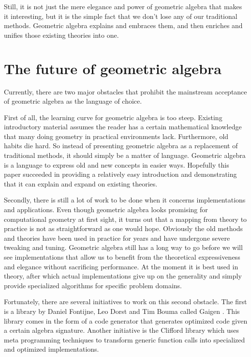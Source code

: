 \documentclass[10pt]{report}
\begin{document}
Still, it is not just the mere elegance and power of geometric
algebra that makes it interesting, but it is the simple fact that
we don't lose any of our traditional methods. Geometric algebra
explains and embraces them, and then enriches and unifies those
existing theories into one.

\section{The future of geometric algebra}

Currently, there are two major obstacles that prohibit the
mainstream acceptance of geometric algebra as the language of
choice.

First of all, the learning curve for geometric algebra is too
steep. Existing introductory material assumes the reader has a
certain mathematical knowledge that many doing geometry in
practical environments lack. Furthermore, old habits die hard. So
instead of presenting geometric algebra as a replacement of
traditional methods, it should simply be a matter of language.
Geometric algebra is a language to express old and new concepts in
easier ways. Hopefully this paper succeeded in providing a
relatively easy introduction and demonstrating that it can explain
and expand on existing theories.

Secondly, there is still a lot of work to be done when it concerns
implementations and applications. Even though geometric algebra
looks promising for computational geometry at first sight, it
turns out that a mapping from theory to practice is not as
straightforward as one would hope. Obviously the old methods and
theories have been used in practice for years and have undergone
severe tweaking and tuning. Geometric algebra still has a long way
to go before we will see implementations that allow us to benefit
from the theoretical expressiveness and elegance without
sacrificing performance. At the moment it is best used in theory,
after which actual implementations give up on the generality and
simply provide specialized algorithms for specific problem
domains.

Fortunately, there are several initiatives to work on this second
obstacle. The first is a library by Daniel Fontijne, Leo Dorst and
Tim Bouma called Gaigen \cite{bib:gaigen}. This library comes in
the form of a code generator that generates optimized code given a
certain algebra signature. Another initiative is the Clifford
library \cite{bib:suter c++ implementation} which uses meta
programming techniques to transform generic function calls into
specialized and optimized implementations.
\end{document}
